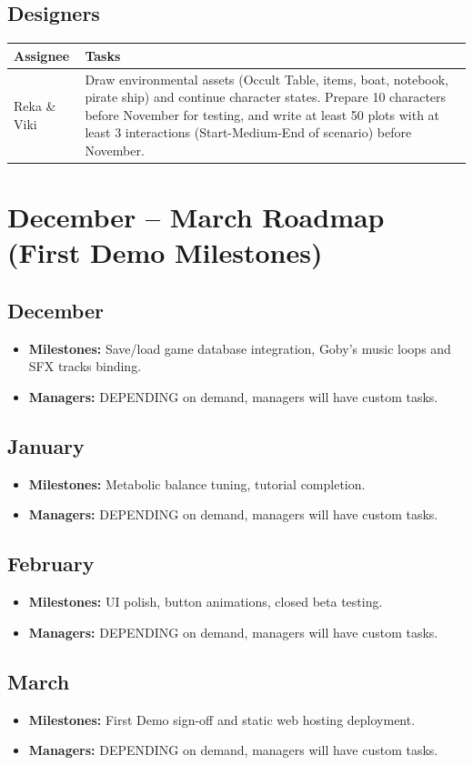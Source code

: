 \documentclass[11pt,a4paper]{article}
\begin{document}
\subsection*{Designers}
\begin{tabularx}{\textwidth}{@{} l X @{}}
\toprule
\textbf{Assignee} & \textbf{Tasks} \\
\midrule
Reka \& Viki & Draw environmental assets (Occult Table, items, boat, notebook, pirate ship) and continue character states. Prepare 10 characters before November for testing, and write at least 50 plots with at least 3 interactions (Start-Medium-End of scenario) before November. \\
\bottomrule
\end{tabularx}


\newpage
\section*{December -- March Roadmap (First Demo Milestones)}

\subsection*{December}
\begin{itemize}
    \item \textbf{Milestones:} Save/load game database integration, Goby's music loops and SFX tracks binding.
    \item \textbf{Managers:} DEPENDING on demand, managers will have custom tasks.
\end{itemize}

\subsection*{January}
\begin{itemize}
    \item \textbf{Milestones:} Metabolic balance tuning, tutorial completion.
    \item \textbf{Managers:} DEPENDING on demand, managers will have custom tasks.
\end{itemize}

\subsection*{February}
\begin{itemize}
    \item \textbf{Milestones:} UI polish, button animations, closed beta testing.
    \item \textbf{Managers:} DEPENDING on demand, managers will have custom tasks.
\end{itemize}

\subsection*{March}
\begin{itemize}
    \item \textbf{Milestones:} First Demo sign-off and static web hosting deployment.
    \item \textbf{Managers:} DEPENDING on demand, managers will have custom tasks.
\end{itemize}
\end{document}
